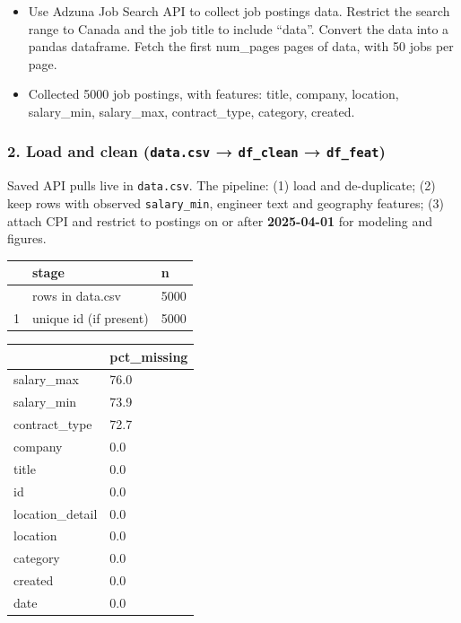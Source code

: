 \documentclass[
  letterpaper,
  DIV=11,
  numbers=noendperiod]{scrartcl}
\begin{document}
\begin{itemize}
\item
  Use Adzuna Job Search API to collect job postings data. Restrict the
  search range to Canada and the job title to include ``data''. Convert
  the data into a pandas dataframe. Fetch the first num\_pages pages of
  data, with 50 jobs per page.
\item
  Collected 5000 job postings, with features: title, company, location,
  salary\_min, salary\_max, contract\_type, category, created.
\end{itemize}

\subsubsection{\texorpdfstring{2. Load and clean (\texttt{data.csv} →
\texttt{df\_clean} →
\texttt{df\_feat})}{2. Load and clean (data.csv → df\_clean → df\_feat)}}\label{load-and-clean-data.csv-df_clean-df_feat}

Saved API pulls live in \texttt{data.csv}. The pipeline: (1) load and
de-duplicate; (2) keep rows with observed \texttt{salary\_min}, engineer
text and geography features; (3) attach CPI and restrict to postings on
or after \textbf{2025-04-01} for modeling and figures.

\begin{longtable}[]{@{}lll@{}}
\toprule\noalign{}
& stage & n \\
\midrule\noalign{}
\endhead
\bottomrule\noalign{}
\endlastfoot
0 & rows in data.csv & 5000 \\
1 & unique id (if present) & 5000 \\
\end{longtable}

\begin{longtable}[]{@{}ll@{}}
\toprule\noalign{}
& pct\_missing \\
\midrule\noalign{}
\endhead
\bottomrule\noalign{}
\endlastfoot
salary\_max & 76.0 \\
salary\_min & 73.9 \\
contract\_type & 72.7 \\
company & 0.0 \\
title & 0.0 \\
id & 0.0 \\
location\_detail & 0.0 \\
location & 0.0 \\
category & 0.0 \\
created & 0.0 \\
date & 0.0 \\
\end{longtable}
\end{document}
